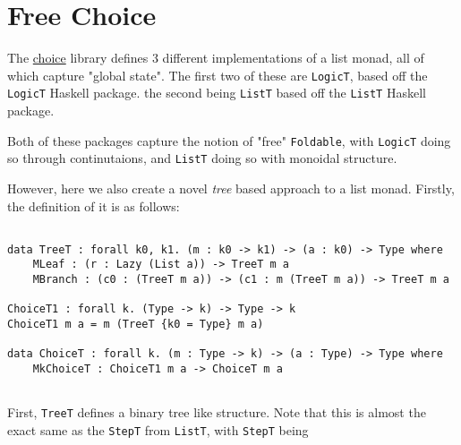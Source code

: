 \section{Free Choice}

The \href{https://github.com/wizard7377/choice}{choice} library defines 3 different implementations of a list monad, all of which capture "global state".
The first two of these are \verb|LogicT|, based off the \needlink\needcite \verb|LogicT| Haskell package.
the second being \verb|ListT| based off the \needlink\needcite \verb|ListT| Haskell package.

Both of these packages capture the notion of "free" \verb|Foldable|, with \verb|LogicT| doing so through continutaions, and \verb|ListT| doing so with monoidal structure.

However, here we also create a novel \emph{tree} based approach to a list monad. 
Firstly, the definition of it is as follows: 

\begin{verbatim}

data TreeT : forall k0, k1. (m : k0 -> k1) -> (a : k0) -> Type where 
	MLeaf : (r : Lazy (List a)) -> TreeT m a
	MBranch : (c0 : (TreeT m a)) -> (c1 : m (TreeT m a)) -> TreeT m a
	
ChoiceT1 : forall k. (Type -> k) -> Type -> k 
ChoiceT1 m a = m (TreeT {k0 = Type} m a)

data ChoiceT : forall k. (m : Type -> k) -> (a : Type) -> Type where 
	MkChoiceT : ChoiceT1 m a -> ChoiceT m a
	
\end{verbatim}
	
First, \verb|TreeT| defines a binary tree like structure.
Note that this is almost the exact same as the \verb|StepT| from \verb|ListT|, with \verb|StepT| being